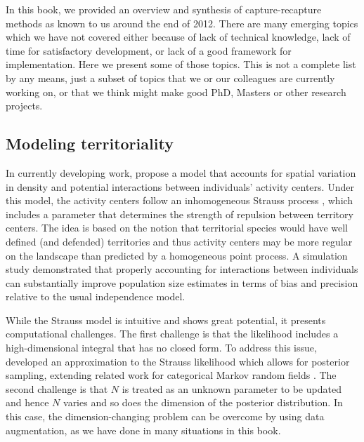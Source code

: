In this book, we provided an overview and synthesis of
capture-recapture methods as known to us around the end of 2012. There
are many emerging topics which we have not covered either because of
lack of technical knowledge, lack of time for satisfactory
development, or lack of a good framework for implementation. Here we
present some of those topics. This is not a complete list by any
means, just a subset of topics that we or our colleagues are currently
working on, or that we think might make good PhD, Masters or other
research projects.


\subsection{Modeling territoriality}
\label{last.sec.ipp}

In currently developing work, \citet{reich_etal:2012} propose a model
that accounts for spatial variation in %
density and
potential interactions between individuals' activity centers.
Under this model,
the activity centers follow an inhomogeneous Strauss process
\citep{strauss:1975}, which %
includes a parameter that determines the strength
of repulsion between territory centers. %
The idea is based on the notion
that territorial species would have well defined (and defended)
territories
and thus activity centers may be more regular on the landscape
than predicted by a homogeneous point process.
A simulation study demonstrated %
that properly accounting for
interactions between individuals can %
substantially improve
population size estimates in terms of bias and precision relative to
the usual independence model.


While the Strauss model is intuitive and shows great potential, it
presents computational challenges. The first challenge is that the
likelihood includes a high-dimensional integral that has no closed
form. To address this issue, \citet{reich_etal:2012} developed an
approximation to the Strauss likelihood which allows for posterior
sampling, extending related work for categorical Markov random fields
\citep{green_richardson:2002,smith_smith:2006}. The second challenge
is that $N$ is treated as an unknown parameter to be updated and hence
$N$ varies and so does the dimension of the posterior distribution.
In this case, the dimension-changing problem can be
overcome by using data augmentation, as we have done in many
situations in this book.


